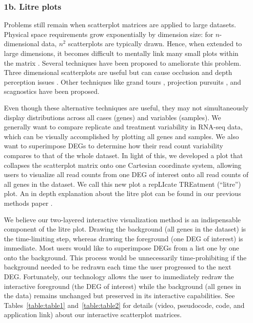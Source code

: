 \documentclass[parskip=full]{bmcart}
\begin{document}
\subsubsection*{1b. Litre plots}

Problems still remain when scatterplot matrices are applied to large datasets. Physical space requirements grow exponentially by dimension size: for $n$-dimensional data, $n^2$ scatterplots are typically drawn. Hence, when extended to large dimensions, it becomes difficult to mentally link many small plots within the matrix \cite{kerren2007human}. Several techniques have been proposed to ameliorate this problem. Three dimensional scatterplots are useful but can cause occlusion and depth perception issues \cite{kerren2007human}. Other techniques like grand tours \cite{asimov1985grand}, projection pursuits \cite{friedman1974projection, cook1995grand}, and scagnostics \cite{wilkinson2005graph} have been proposed.

Even though these alternative techniques are useful, they may not simultaneously display distributions across all cases (genes) and variables (samples). We generally want to compare replicate and treatment variability in RNA-seq data, which can be visually accomplished by plotting all genes and samples. We also want to superimpose DEGs to determine how their read count variability compares to that of the whole dataset. In light of this, we developed a plot that collapses the scatterplot matrix onto one Cartesian coordinate system, allowing users to visualize all read counts from one DEG of interest onto all read counts of all genes in the dataset. We call this new plot a repLIcate TREatment (``litre'') plot. An in depth explanation about the litre plot can be found in our previous methods paper \cite{rutter1}.

We believe our two-layered interactive visualization method is an indispensable component of the litre plot. Drawing the background (all genes in the dataset) is the time-limiting step, whereas drawing the foreground (one DEG of interest) is immediate. Most users would like to superimpose DEGs from a list one by one onto the background. This process would be unnecessarily time-prohibiting if the background needed to be redrawn each time the user progressed to the next DEG. Fortunately, our technology allows the user to immediately redraw the interactive foreground (the DEG of interest) while the background (all genes in the data) remains unchanged but preserved in its interactive capabilities. See Tables~\ref{table:table1} and~\ref{table:table2} for details (video, pseudocode, code, and application link) about our interactive scatterplot matrices.
\end{document}

